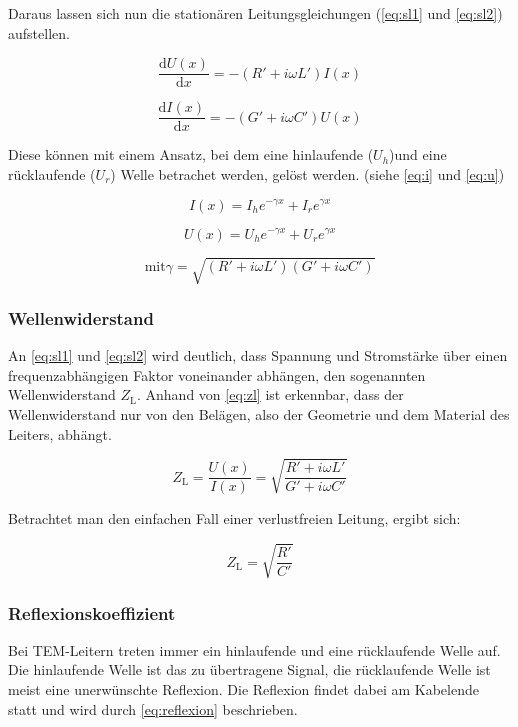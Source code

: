 Daraus lassen sich nun die stationären Leitungsgleichungen (\cref{eq:sl1} und \cref{eq:sl2}) aufstellen.

\begin{equation}
	\frac{\text{d}U(x)}{\text{d}x} = -(R' + i\omega L')I(x)
	\label{eq:sl1}
\end{equation}

\begin{equation}
	\frac{\text{d}I(x)}{\text{d}x} = -(G' + i\omega C')U(x)
	\label{eq:sl2}
\end{equation}

Diese können mit einem Ansatz, bei dem eine hinlaufende ($U_h$)und eine rücklaufende ($U_r$) Welle betrachet werden, gelöst werden. (siehe \cref{eq:i} und \cref{eq:u})

\begin{equation}
	I(x) = I_h e^{-\gamma x} + I_r e^{\gamma x}
	\label{eq:i}
\end{equation}

\begin{equation}
U(x) = U_h e^{-\gamma x} + U_r e^{\gamma x}
\label{eq:u}
\end{equation}

\begin{equation*}
	\text{mit} \gamma = \sqrt{(R' + i\omega L')(G' + i\omega C')}
\end{equation*}

\subsubsection{Wellenwiderstand}
An \cref{eq:sl1} und \cref{eq:sl2} wird deutlich, dass Spannung und Stromstärke über einen frequenzabhängigen Faktor voneinander abhängen, den sogenannten Wellenwiderstand $Z_\text{L}$. Anhand von \cref{eq:zl} ist erkennbar, dass der Wellenwiderstand nur von den Belägen, also der Geometrie und dem Material des Leiters, abhängt.

\begin{equation}
	Z_\text{L} = \frac{U(x)}{I(x)} = \sqrt{\frac{R' + i\omega L'}{G' + i\omega C'}}
	\label{eq:zl}
\end{equation}

Betrachtet man den einfachen Fall einer verlustfreien Leitung, ergibt sich:

\begin{equation}
	Z_\text{L} = \sqrt{\frac{R'}{C'}}
	\label{eq:zl2}
\end{equation}

\subsubsection{Reflexionskoeffizient}
Bei TEM-Leitern treten immer ein hinlaufende und eine rücklaufende Welle auf. Die hinlaufende Welle ist das zu übertragene Signal, die rücklaufende Welle ist meist eine unerwünschte Reflexion. Die Reflexion findet dabei am Kabelende statt und wird durch \cref{eq:reflexion} beschrieben.

